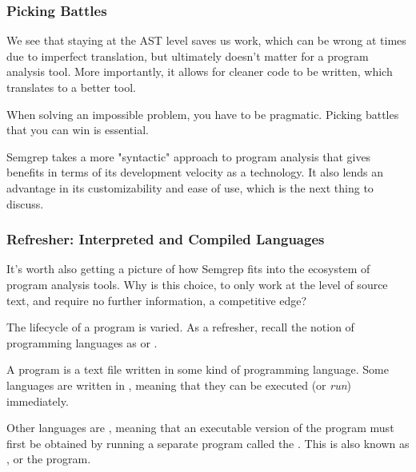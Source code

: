 \documentclass[aspectratio=169, handout]{beamer}
\begin{document}
 \begin{frame}[fragile]
   \frametitle{Picking Battles}

   We see that staying at the AST level saves us work, which can be wrong at
   times due to imperfect translation, but ultimately doesn't matter for a
   program analysis tool. More importantly, it allows for cleaner code to
   be written, which translates to a better tool.

   \pause
   \vspace{\fill}

   When solving an impossible problem, you have to be pragmatic. Picking
   battles that you can win is essential.

   \pause
   \vspace{\fill}

   Semgrep takes a more "syntactic" approach to program analysis that gives
   benefits in terms of its development velocity as a technology. It also lends an
   advantage in its customizability and ease of use, which is the next thing to discuss.
 \end{frame}

 \begin{frame}[fragile]
   \frametitle{Refresher: Interpreted and Compiled Languages}

   It's worth also getting a picture of how Semgrep fits into the ecosystem of program analysis
   tools. Why is this choice, to only work at the level of source text, and require no further
   information, a competitive edge?

   \pause
   \vspace{\fill}

   The lifecycle of a program is varied. As a refresher, recall the notion of
   programming languages as  or .

   \pause
   \vspace{\fill}

   A program is a text file written in some kind of programming language. Some languages
   are written in , meaning that they can be executed (or \textit{run})
   immediately.

   \pause
   \vspace{\fill}

   Other languages are , meaning that an executable version of
   the program must first be obtained by running a separate program called the
   . This is also known as , or  the program.
 \end{frame}
\end{document}
